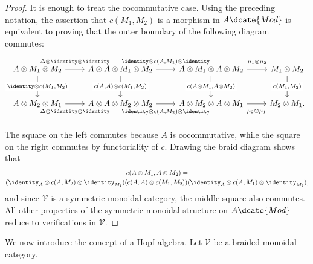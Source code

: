 \begin{proof}
	It is enough to treat the cocommutative case. Using the preceding notation,
	the assertion that $c(M_1,M_2)$ is a morphism in $A\dcate{Mod}$ is
	equivalent to proving that the outer boundary of the following diagram
	commutes:
	\[\begin{tikzcd}[row sep=large]
		A \otimes M_1 \otimes M_2 \arrow[r, "{\Delta \otimes \identity \otimes \identity}" inner sep=0.6em] \arrow[d, "{\identity \otimes c(M_1, M_2)}" description] & A \otimes A \otimes M_1 \otimes M_2 \arrow[r, "{\identity \otimes c(A, M_1) \otimes \identity}" inner sep=0.6em] \arrow[d, "{c(A, A) \otimes c(M_1, M_2)}" description] & A \otimes M_1 \otimes A \otimes M_2 \arrow[r, "{\mu_1 \otimes \mu_2}" inner sep=0.6em] \arrow[d, "{c(A \otimes M_1, A \otimes M_2)}" description] & M_1 \otimes M_2 \arrow[d, "{c(M_1, M_2)}" description] \\
		A \otimes M_2 \otimes M_1 \arrow[r, "{\Delta \otimes \identity \otimes \identity}"' inner sep=0.6em] & A \otimes A \otimes M_2 \otimes M_2 \arrow[r, "{\identity \otimes c(A, M_2) \otimes \identity}"' inner sep=0.6em] & A \otimes M_2 \otimes A \otimes M_1 \arrow[r, "{\mu_2 \otimes \mu_1}"' inner sep=0.6em] & M_2 \otimes M_1 .
	\end{tikzcd}\]

	The square on the left commutes because $A$ is cocommutative, while the
	square on the right commutes by functoriality of $c$. Drawing the braid
	diagram shows that
	\begin{multline*}
		c(A \otimes M_1, A \otimes M_2) = \\
		(\identity_A \otimes c(A, M_2) \otimes \identity_{M_1}) (c(A, A) \otimes c(M_1, M_2)) (\identity_A \otimes c(A, M_1) \otimes \identity_{M_2}),
	\end{multline*}
	and since $\mathcal{V}$ is a symmetric monoidal category, the middle
	square also commutes. All other properties of the symmetric monoidal
	structure on $A\dcate{Mod}$ reduce to verifications in $\mathcal{V}$.
\end{proof}

We now introduce the concept of a Hopf algebra. Let $\mathcal{V}$ be a
braided monoidal category.

